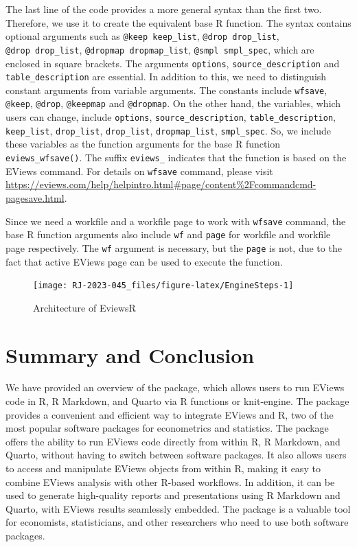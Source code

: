 The last line of the code provides a more general syntax than the first two. Therefore, we use it to create the equivalent base R function. The syntax contains optional arguments such as \texttt{@keep\ keep\_list}, \texttt{@drop\ drop\_list}, \texttt{@drop\ drop\_list}, \texttt{@dropmap\ dropmap\_list}, \texttt{@smpl\ smpl\_spec}, which are enclosed in square brackets. The arguments \texttt{options}, \texttt{source\_description} and \texttt{table\_description} are essential. In addition to this, we need to distinguish constant arguments from variable arguments. The constants include \texttt{wfsave}, \texttt{@keep}, \texttt{@drop}, \texttt{@keepmap} and \texttt{@dropmap}. On the other hand, the variables, which users can change, include \texttt{options}, \texttt{source\_description}, \texttt{table\_description}, \texttt{keep\_list}, \texttt{drop\_list}, \texttt{drop\_list}, \texttt{dropmap\_list}, \texttt{smpl\_spec}. So, we include these variables as the function arguments for the base R function \texttt{eviews\_wfsave()}. The suffix \texttt{eviews\_} indicates that the function is based on the EViews command. For details on \texttt{wfsave} command, please visit \url{https://eviews.com/help/helpintro.html\#page/content\%2Fcommandcmd-pagesave.html}.

Since we need a workfile and a workfile page to work with \texttt{wfsave} command, the base R function arguments also include \texttt{wf} and \texttt{page} for workfile and workfile page respectively. The \texttt{wf} argument is necessary, but the \texttt{page} is not, due to the fact that active EViews page can be used to execute the function.

\begin{figure}

{\centering \texttt{[image: RJ-2023-045\_files/figure-latex/EngineSteps-1]} 

}

\caption{Architecture of EviewsR}\label{fig:EngineSteps}
\end{figure}

\hypertarget{sec-conclusion}{%
\section{Summary and Conclusion}\label{sec-conclusion}}

We have provided an overview of the  package, which allows users to run EViews code in R, R Markdown, and Quarto via R functions or knit-engine. The package provides a convenient and efficient way to integrate EViews and R, two of the most popular software packages for econometrics and statistics. The package offers the ability to run EViews code directly from within R, R Markdown, and Quarto, without having to switch between software packages. It also allows users to access and manipulate EViews objects from within R, making it easy to combine EViews analysis with other R-based workflows. In addition, it can be used to generate high-quality reports and presentations using R Markdown and Quarto, with EViews results seamlessly embedded. The package is a valuable tool for economists, statisticians, and other researchers who need to use both software packages.

